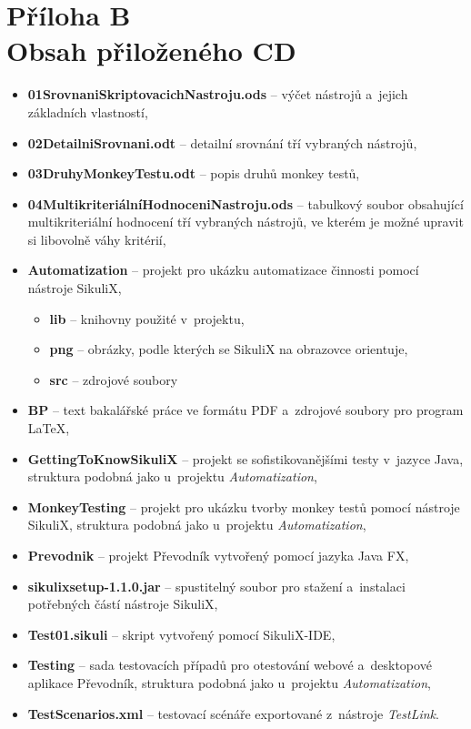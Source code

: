 \chapter*{Příloha B\\Obsah přiloženého CD}

\begin{itemize}
	\item \textbf{01SrovnaniSkriptovacichNastroju.ods} -- výčet nástrojů a~jejich základních vlastností,
	\item \textbf{02DetailniSrovnani.odt} -- detailní srovnání tří vybraných nástrojů,
	\item \textbf{03DruhyMonkeyTestu.odt} -- popis druhů monkey testů,
	\item \textbf{04MultikriteriálníHodnoceniNastroju.ods} -- tabulkový soubor obsahující multikriteriální hodnocení tří vybraných nástrojů, ve kterém je možné upravit si libovolně váhy kritérií,
	\item \textbf{Automatization} -- projekt pro ukázku automatizace činnosti pomocí nástroje SikuliX,
		\begin{itemize}
			\item \textbf{lib} -- knihovny použité v~projektu,
			\item \textbf{png} -- obrázky, podle kterých se SikuliX na obrazovce orientuje,
			\item \textbf{src} -- zdrojové soubory
		\end{itemize}
	\item \textbf{BP} -- text bakalářské práce ve formátu PDF a~zdrojové soubory pro program \LaTeX,
	\item \textbf{GettingToKnowSikuliX} -- projekt se sofistikovanějšími testy v~jazyce Java, struktura podobná jako u~projektu \emph{Automatization},
	\item \textbf{MonkeyTesting} -- projekt pro ukázku tvorby monkey testů pomocí nástroje SikuliX, struktura podobná jako u~projektu \emph{Automatization},
	\item \textbf{Prevodnik} -- projekt Převodník vytvořený pomocí jazyka Java FX,
	\item \textbf{sikulixsetup-1.1.0.jar} -- spustitelný soubor pro stažení a~instalaci potřebných částí nástroje SikuliX,
	\item \textbf{Test01.sikuli} -- skript vytvořený pomocí SikuliX-IDE,
	\item \textbf{Testing} -- sada testovacích případů pro otestování webové a~desktopové aplikace Převodník, struktura podobná jako u~projektu \emph{Automatization},
	\item \textbf{TestScenarios.xml} -- testovací scénáře exportované z~nástroje \emph{TestLink}.
\end{itemize}